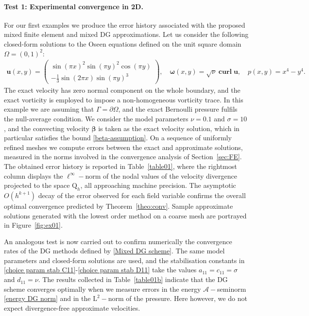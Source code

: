 \documentclass[reqno,a4paper]{article}
\numberwithin{equation}{section}
\newcommand\bu{\boldsymbol{u}}
\newcommand\bbbeta{\boldsymbol{\beta}}
\renewcommand\L{\mathrm{L}}
\newcommand\Q{\mathrm{Q}}
\newcommand\bomega{\boldsymbol{\omega}}
\newcommand\curl{\mathop{\mathbf{curl}}\nolimits}
\begin{document}
\paragraph{Test 1: Experimental convergence in 2D.}  For our first 
examples we produce the error history associated with the proposed mixed finite element and mixed 
DG approximations. Let us consider the following closed-form solutions to the Oseen equations 
defined on the unit square domain $\Omega=(0,1)^2$:
\begin{align*}
\bu(x,y) =\! \begin{pmatrix}
\sin(\pi x)^2\sin(\pi y)^2\cos(\pi y)\\
-\frac{1}{3}\sin(2\pi x)\sin(\pi y)^3\end{pmatrix}, \quad 
\bomega (x,y)= \sqrt{\nu} \curl\bu,\quad 
p(x,y) = x^4 - y^4.\end{align*}
The exact velocity has zero normal component on the whole boundary, and the exact 
vorticity is employed to impose a non-homogeneous vorticity trace. In this 
example we are assuming 
that $\Gamma=\partial\Omega$, and 
the exact Bernoulli 
pressure fulfils the null-average condition. We consider the model parameters 
$\nu = 0.1$ and $\sigma = 10$, and the convecting velocity $\bbbeta$ is taken as the exact 
velocity solution, which in particular satisfies the bound \eqref{beta-assumption}.  
On a sequence of uniformly refined meshes we compute 
errors between the exact and approximate solutions,  measured in the
norms involved in the convergence analysis of Section~\ref{sec:FE}. 
The obtained error history is reported in
Table~\ref{table01}, where the rightmost column displays the $\ell^\infty-$norm 
of the nodal values of the velocity divergence projected to the space $\Q_h$, 
all approaching machine precision. 
The asymptotic $O(h^{k+1})$ decay of the error
observed for each field variable 
confirms the overall optimal convergence 
predicted by Theorem~\ref{theo:conv}. Sample approximate solutions
generated with the lowest order method on a coarse mesh are portrayed in
Figure~\ref{fig:ex01}.

An analogous test is now carried out to confirm numerically the convergence 
rates of the DG methods defined by \eqref{Mixed DG scheme}. The same model 
parameters and closed-form solutions are used, and the stabilisation constants 
in \eqref{choice param stab C11}-\eqref{choice param stab D11} take the values 
$a_{11}=c_{11}=\sigma$ and $d_{11}=\nu$. The results collected in Table~\ref{table01b} 
indicate that the DG scheme converges optimally when we measure errors in the energy 
$\mathcal{A}-$seminorm \eqref{energy DG norm} and in the $\L^2-$norm of the pressure. 
Here however, we do not expect divergence-free approximate velocities. 
\end{document}

